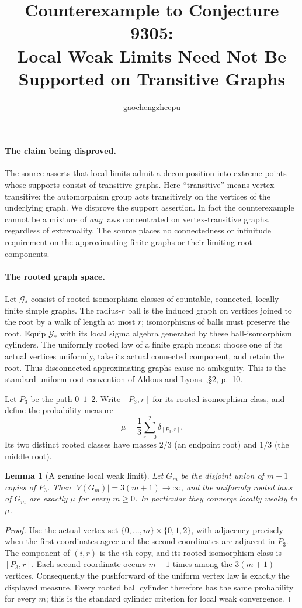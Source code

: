 \documentclass[11pt]{article}
\title{Counterexample to Conjecture 9305:\\Local Weak Limits Need Not Be Supported on Transitive Graphs}
\author{gaochengzhecpu}
\date{}
\newtheorem{lemma}{Lemma}
\newcommand{\Gstar}{\mathcal G_*}
\begin{document}
\maketitle

\paragraph{The claim being disproved.}
The source asserts that local limits admit a decomposition into extreme
points whose supports consist of transitive graphs.  Here ``transitive''
means vertex-transitive: the automorphism group acts transitively on the
vertices of the underlying graph.  We disprove the support assertion.
In fact the counterexample cannot be a mixture of \emph{any} laws
concentrated on vertex-transitive graphs, regardless of extremality.
The source places no connectedness or infinitude requirement on the
approximating finite graphs or their limiting root components.

\paragraph{The rooted graph space.}
Let $\Gstar$ consist of rooted isomorphism classes of countable, connected,
locally finite simple graphs.  The radius-$r$ ball is the induced graph on
vertices joined to the root by a walk of length at most $r$; isomorphisms
of balls must preserve the root.  Equip $\Gstar$ with its local sigma
algebra generated by these ball-isomorphism cylinders.  The uniformly
rooted law of a finite graph means: choose one of its actual vertices
uniformly, take its actual connected component, and retain the root.
Thus disconnected approximating graphs cause no ambiguity. This is the
standard uniform-root convention of Aldous and Lyons~\cite{AL},\S2, p.~10.

Let $P_3$ be the path $0$--$1$--$2$.  Write $[P_3,r]$ for its rooted
isomorphism class, and define the probability measure
\[
 \mu=\frac13\sum_{r=0}^2\delta_{[P_3,r]}.
\]
Its two distinct rooted classes have masses $2/3$ (an endpoint root)
and $1/3$ (the middle root).

\begin{lemma}[A genuine local weak limit]
Let $G_m$ be the disjoint union of $m+1$ copies of $P_3$.  Then
$|V(G_m)|=3(m+1)\to\infty$, and the uniformly rooted laws of $G_m$
are exactly $\mu$ for every $m\geq0$.  In particular they converge
locally weakly to $\mu$.
\end{lemma}
\begin{proof}
Use the actual vertex set
$\{0,\ldots,m\}\times\{0,1,2\}$, with adjacency precisely when the
first coordinates agree and the second coordinates are adjacent in
$P_3$.  The component of $(i,r)$ is the $i$th copy, and its rooted
isomorphism class is $[P_3,r]$.  Each second coordinate occurs $m+1$
times among the $3(m+1)$ vertices.  Consequently the pushforward of
the uniform vertex law is exactly the displayed measure.  Every
rooted ball cylinder therefore has the same probability for every $m$;
this is the standard cylinder criterion for local weak convergence.
\end{proof}
\end{document}
